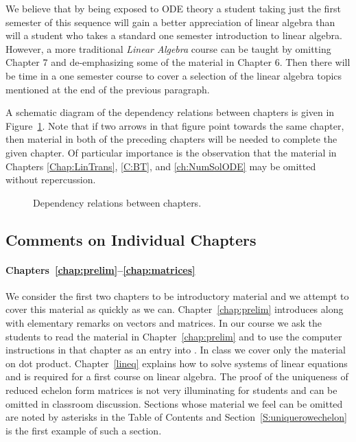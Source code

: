 \documentclass{ximera}
\begin{document}
We believe that by being exposed to ODE theory a student taking just the 
first semester of this sequence will gain a better appreciation of linear 
algebra than will a student who takes a standard one semester introduction 
to linear algebra.  However, a more traditional {\em Linear Algebra\/} course 
can be taught by omitting Chapter 7 and de-emphasizing some of the material 
in Chapter 6.  Then there will be time in a one semester course to cover a 
selection of the linear algebra topics mentioned at the end of the previous 
paragraph. 

A schematic diagram of the dependency relations between chapters is given in
Figure~\ref{F:depdiag}.  Note that if two arrows in that figure point towards 
the same chapter, then material in both of the preceding chapters will be 
needed to complete the given chapter.  Of particular importance is the
observation that the material in Chapters \ref{Chap:LinTrans}, \ref{C:BT}, 
and \ref{ch:NumSolODE} may be omitted without repercussion.

\begin{figure}[htb]
     \centerline{%
     }
     \caption{Dependency relations between chapters.}
     \label{F:depdiag}
\end{figure}

\subsection*{Comments on Individual Chapters}

\paragraph{Chapters~\ref{chap:prelim}--\ref{chap:matrices}}  We consider the 
first two chapters to be introductory material and we attempt to cover this 
material as quickly as we can.  Chapter~\ref{chap:prelim} introduces \Matlab 
along with elementary remarks on vectors and matrices.  In our course we ask 
the students to read the material in 
Chapter~\ref{chap:prelim} and to use the computer instructions in that
chapter as an entry into \Matlabp.  In class we cover only the material on
dot product.  Chapter~\ref{lineq} explains how to solve systems of linear
equations and is required for a first course on linear algebra.  The proof of
the uniqueness of reduced echelon form matrices is not very illuminating
for students and can be omitted in classroom discussion.  Sections whose
material we feel can be omitted are noted by asterisks in the Table of 
Contents and Section~\ref{S:uniquerowechelon} is the first example of such 
a section.
\end{document}
